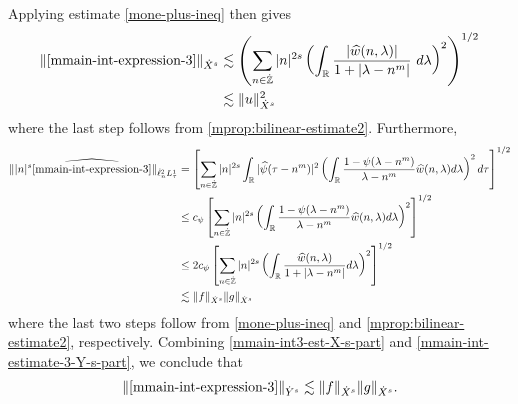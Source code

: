 %
%
Applying estimate \eqref{mone-plus-ineq} then gives
%
\begin{equation}
	\label{mmain-int3-est-X-s-part}
	\begin{split}
		\| \eqref{mmain-int-expression-3} \|_{\dot{X}^s}
		& \lesssim \left( \sum_{n \in \dot{\mathbb{Z}}} |n|^{2s}  \left ( \int_{\mathbb{R}}
		\frac{|\widehat{w}(n, \lambda)| }{1 + |\lambda - n^m|}
		 \ d\lambda \right )^2 \right)^{1/2}
		 \\
		& \lesssim \|u\|_{\dot{X}^s}^2
	\end{split}
\end{equation}
%
where the last step follows from \cref{mprop:bilinear-estimate2}.
Furthermore, 
%
%
\begin{equation}
	\label{mmain-int-estimate-3-Y-s-part}
	\begin{split}
		\| | n |^s \widehat{\eqref{mmain-int-expression-3}}\|_{\dot{\ell}^2_n L^1_\tau}
		& = \left[ \sum_{n \in \dot{\mathbb{Z}}} |n|^{2s} \int_{\mathbb{R}} |
		\widehat{\psi}(\tau - n^m) |^{2} \left( \int_{\mathbb{R}}\frac{1 - \psi(\lambda -
		n^m)}{\lambda - n^m} \widehat{w}(n, \lambda) d \lambda \right)^{2} d \tau
		\right]^{1/2}
		\\
		& \le c_{\psi} \left[ \sum_{n \in \dot{\mathbb{Z}}} |n|^{2s} \left(
		\int_{\mathbb{R}} \frac{1 - \psi(\lambda - n^m)}{\lambda - n^m}
		\widehat{w}(n, \lambda) d \lambda
		\right)^{2}\right]^{1/2}
		\\
		& \le 2 c_{\psi} \left[ \sum_{n \in \dot{\mathbb{Z}}} |n|^{2s} \left(
		\int_{\mathbb{R}} \frac{\widehat{w}(n, \lambda) }{1 + |\lambda - n^m|}
		d \lambda
		\right)^{2}\right]^{1/2}
		\\
		& \lesssim \|f\|_{\dot{X}^s} \|g\|_{\dot{X}^s} 
	\end{split}
\end{equation}
%
%
where the last two steps follow from \eqref{mone-plus-ineq} and
\cref{mprop:bilinear-estimate2}, respectively. Combining
\eqref{mmain-int3-est-X-s-part} and \eqref{mmain-int-estimate-3-Y-s-part}, we
conclude that
%
%
\begin{equation}
	\label{mmain-int3-est}
	\begin{split}
		\|\eqref{mmain-int-expression-3}\|_{\dot{Y}^s} 
		\lesssim \|f\|_{\dot{X}^s} \|g\|_{\dot{X}^s}.
	\end{split}
\end{equation}
%
%
%
